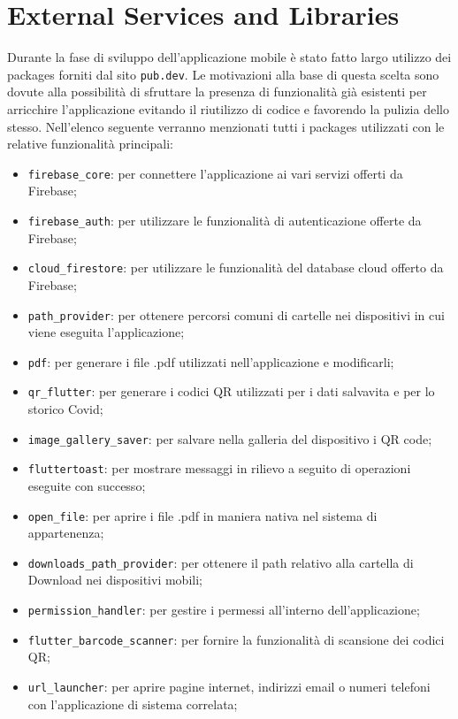 \documentclass[12pt,a4paper,twoside,openright,titlepage]{book}
\begin{document}
\section{External Services and Libraries}
Durante la fase di sviluppo dell'applicazione mobile è stato fatto largo utilizzo dei packages forniti dal sito \texttt{pub.dev}. Le motivazioni alla base di questa scelta sono dovute alla possibilità di sfruttare la presenza di funzionalità già esistenti per arricchire l'applicazione evitando il riutilizzo di codice e favorendo la pulizia dello stesso. Nell'elenco seguente verranno menzionati tutti i packages utilizzati con le relative funzionalità principali:
\begin{itemize}
\item \texttt{firebase\_core}: per connettere l'applicazione ai vari servizi offerti da Firebase;
\item \texttt{firebase\_auth}: per utilizzare le funzionalità di autenticazione offerte da Firebase;
\item \texttt{cloud\_firestore}: per utilizzare le funzionalità del database cloud offerto da Firebase;
\item \texttt{path\_provider}: per ottenere percorsi comuni di cartelle nei dispositivi in cui viene eseguita l'applicazione;
\item \texttt{pdf}: per generare i file .pdf utilizzati nell'applicazione e modificarli;
\item \texttt{qr\_flutter}: per generare i codici QR utilizzati per i dati salvavita e per lo storico Covid;
\item \texttt{image\_gallery\_saver}: per salvare nella galleria del dispositivo i QR code;
\item \texttt{fluttertoast}: per mostrare messaggi in rilievo a seguito di operazioni eseguite con successo;
\item \texttt{open\_file}: per aprire i file .pdf in maniera nativa nel sistema di appartenenza;
\item \texttt{downloads\_path\_provider}: per ottenere il path relativo alla cartella di Download nei dispositivi mobili;
\item \texttt{permission\_handler}: per gestire i permessi all'interno dell'applicazione;
\item \texttt{flutter\_barcode\_scanner}: per fornire la funzionalità di scansione dei codici QR;
\item \texttt{url\_launcher}: per aprire pagine internet, indirizzi email o numeri telefoni con l'applicazione di sistema correlata;

\end{itemize}
\end{document}
